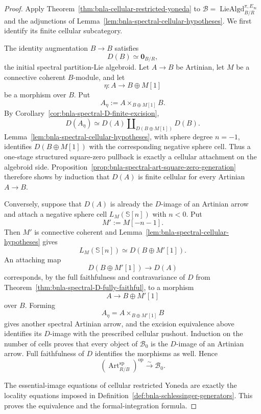 \begin{proof}
Apply Theorem~\ref{thm:bnla-cellular-restricted-yoneda} to
$\mathcal B=\operatorname{LieAlgd}^{\pi,E_\infty}_{B/R}$ and the adjunctions
of Lemma~\ref{lem:bnla-spectral-cellular-hypotheses}.  We first identify its
finite cellular subcategory.

The identity augmentation $B\to B$ satisfies
\[
    D(B)\simeq\mathbf 0_{B/R},
\]
the initial spectral partition-Lie algebroid.  Let $A\to B$ be Artinian, let
$M$ be a connective coherent $B$-module, and let
\[
    \eta:A\longrightarrow B\oplus M[1]
\]
be a morphism over $B$.  Put
\[
    A_\eta:=A\times_{B\oplus M[1]}B.
\]
By Corollary~\ref{cor:bnla-spectral-D-finite-excision},
\[
\boxed{
    D(A_\eta)
    \simeq
    D(A)\amalg_{D(B\oplus M[1])}D(B).}
\]
Lemma~\ref{lem:bnla-spectral-cellular-hypotheses}, with sphere degree
$n=-1$, identifies $D(B\oplus M[1])$ with the corresponding negative sphere
cell.  Thus a one-stage structured square-zero pullback is exactly a cellular
attachment on the algebroid side.  Proposition~\ref{prop:bnla-spectral-art-square-zero-generation}
therefore shows by induction that $D(A)$ is finite cellular for every
Artinian $A\to B$.

Conversely, suppose that $D(A)$ is already the $D$-image of an Artinian arrow
and attach a negative sphere cell $L_M(\mathbb S[n])$ with $n<0$.  Put
\[
    M':=M[-n-1].
\]
Then $M'$ is connective coherent and
Lemma~\ref{lem:bnla-spectral-cellular-hypotheses} gives
\[
    L_M(\mathbb S[n])
    \simeq
    D(B\oplus M'[1]).
\]
An attaching map
\[
    D(B\oplus M'[1])\longrightarrow D(A)
\]
corresponds, by the full faithfulness and contravariance of
$D$ from Theorem~\ref{thm:bnla-spectral-D-fully-faithful}, to a morphism
\[
    A\longrightarrow B\oplus M'[1]
\]
over $B$.  Forming
\[
    A_\eta=A\times_{B\oplus M'[1]}B
\]
gives another spectral Artinian arrow, and the excision equivalence above
identifies its $D$-image with the prescribed cellular pushout.  Induction on
the number of cells proves that every object of $\mathcal B_0$ is the
$D$-image of an Artinian arrow.  Full faithfulness of $D$ identifies the
morphisms as well.  Hence
\[
\boxed{
    \left(\operatorname{Art}^{\mathrm{sp}}_{R/B}\right)^{\mathrm{op}}
    \xrightarrow{\sim}
    \mathcal B_0.}
\]

The essential-image equations of cellular restricted Yoneda are exactly the
locality equations imposed in
Definition~\ref{def:bnla-schlessinger-generators}.  This proves the
equivalence and the formal-integration formula.


\end{proof}
